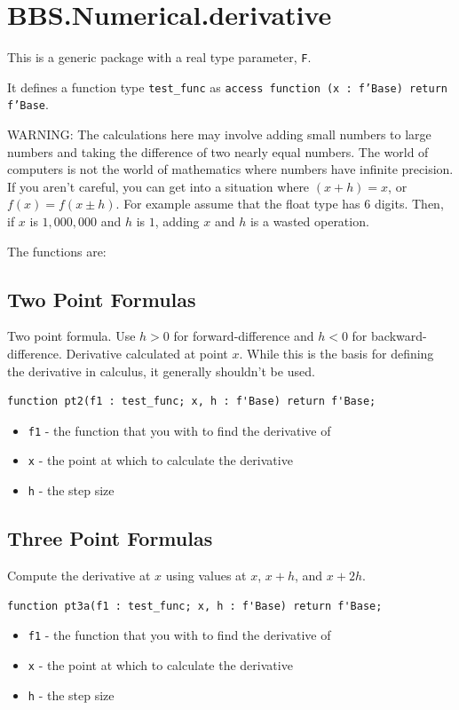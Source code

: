 \documentclass[10pt, openany]{book}
\newcommand{\indexfunc}[1]{\index[func]{#1}}
\newcommand{\function}[1]{\texttt{#1}}
\newcommand{\datatype}[1]{\texttt{#1}}
\begin{document}
\section{BBS.Numerical.derivative}
This is a generic package with a real type parameter, \datatype{F}.

It defines a function type \datatype{test\_func} as \datatype{access function (x : f'Base) return f'Base}.

WARNING:
The calculations here may involve adding small numbers to large numbers and taking the difference of two nearly equal numbers.
The world of computers is not the world of mathematics where numbers have infinite precision.  If you aren't careful, you can get into a situation where $(x + h) = x$, or $f(x) = f(x \pm h)$. For example assume that the float type has 6 digits.  Then, if $x$ is $1,000,000$ and $h$ is $1$, adding $x$ and $h$ is a wasted operation.

The functions are:
\subsection{Two Point Formulas}
Two point formula.  Use $h>0$ for forward-difference and $h<0$ for backward-difference.  Derivative calculated at point $x$.  While this is the basis for defining the derivative in calculus, it generally shouldn't be used.
\begin{lstlisting}
function pt2(f1 : test_func; x, h : f'Base) return f'Base;
\end{lstlisting}
\indexfunc{derivative-pt2}
\begin{itemize}
  \item \function{f1} - the function that you with to find the derivative of
  \item \function{x} - the point at which to calculate the derivative
  \item \function{h} - the step size
\end{itemize}

\subsection{Three Point Formulas}
Compute the derivative at $x$ using values at $x$, $x+h$, and $x+2h$.
\begin{lstlisting}
function pt3a(f1 : test_func; x, h : f'Base) return f'Base;
\end{lstlisting}
\indexfunc{derivative-pt3a}
\begin{itemize}
  \item \function{f1} - the function that you with to find the derivative of
  \item \function{x} - the point at which to calculate the derivative
  \item \function{h} - the step size
\end{itemize}
\end{document}
